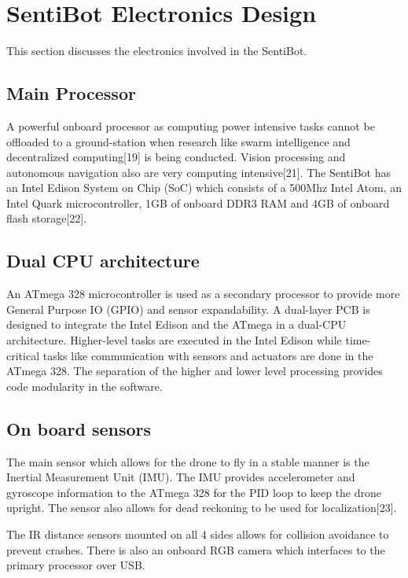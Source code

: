 \documentclass[12pt]{article}
\begin{document}
\section{SentiBot Electronics Design}

This section discusses the electronics involved in the SentiBot.

\subsection{Main Processor}

A powerful onboard processor as computing power intensive tasks cannot be offloaded to a ground-station when research like swarm intelligence and decentralized computing[19] is being conducted. Vision processing and autonomous navigation also are very computing intensive[21]. The SentiBot has an Intel Edison System on Chip (SoC) which consists of a 500Mhz Intel Atom, an Intel Quark microcontroller, 1GB of onboard DDR3 RAM and 4GB of onboard flash storage[22].

\subsection{Dual CPU architecture}

An ATmega 328 microcontroller is used as a secondary processor to provide more General Purpose IO (GPIO) and sensor expandability. A dual-layer PCB is designed to integrate the Intel Edison and the ATmega in a dual-CPU architecture. Higher-level tasks are executed in the Intel Edison while time-critical tasks like communication with sensors and actuators are done in the ATmega 328. The separation of the higher and lower level processing provides code modularity in the software.

\subsection{On board sensors}

The main sensor which allows for the drone to fly in a stable manner is the Inertial Measurement Unit (IMU). The IMU provides accelerometer and gyroscope information to the ATmega 328 for the PID loop to keep the drone upright. The sensor also allows for dead reckoning to be used for localization[23].

The IR distance sensors mounted on all 4 sides allows for collision avoidance to prevent crashes. There is also an onboard RGB camera which interfaces to the primary processor over USB. 
\end{document}
